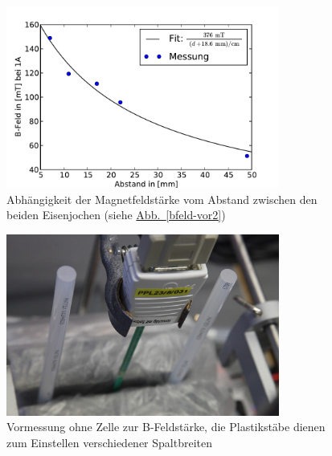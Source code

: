 \documentclass[11pt]{scrartcl}
\newcommand{\abb}[1]{\hyperref[#1]{Abb.~\ref{#1}}}
\begin{document}
\begin{figure}[ht]
\begin{center}
\includegraphics[width=0.8\textwidth]{images/messung_B-Feld-Abstand.pdf}
\end{center}
\vspace{-1.5\baselineskip}
\caption{Abhängigkeit der Magnetfeldstärke vom Abstand zwischen den beiden Eisenjochen (siehe \abb{bfeld-vor2})}
\label{messung_B-Feld-Abstand}
\end{figure}


\begin{figure}[ht]
\begin{center}
\includegraphics[width=0.8\textwidth]{images/bfeld-vor1.jpg}
\end{center}
\vspace{-1.5\baselineskip}
\caption{Vormessung ohne Zelle zur B-Feldst\"arke, die Plastikst\"abe dienen zum Einstellen verschiedener Spaltbreiten}
\label{bfeld-vor1}
\end{figure}
\end{document}

